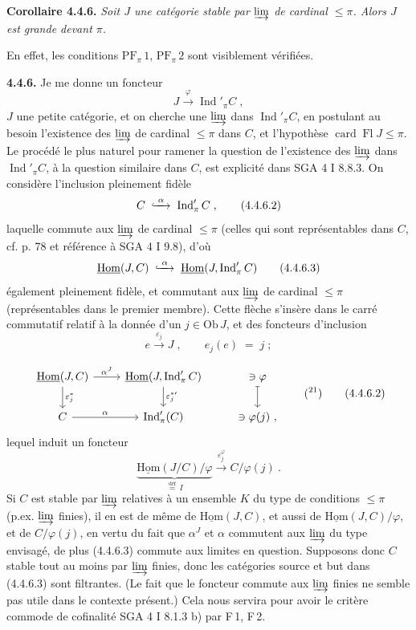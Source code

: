 \documentclass[11pt]{article}
\newcommand{\printedpage}[1]{\if\relax\detokenize{#1}\relax\else\marginpar{\footnotesize p.~#1}\fi}
\newcommand{\msp}[1]{\marginpar{\footnotesize [#1]}}
\newcommand{\uHom}{\underline{\mathrm{Hom}}}
\newcommand{\Ob}{\mathrm{Ob}\,}
\newcommand{\card}{\operatorname{card}}
\newcommand{\Fl}{\operatorname{Fl}}
\newcommand{\Ind}{\operatorname{Ind}}
\newcommand{\hookxrightarrow}[2][]{\lhook\joinrel\xrightarrow[#1]{#2}}
\begin{document}
\textbf{Corollaire 4.4.6.} \textit{Soit $J$ une catégorie stable par} $\varinjlim$ \textit{de cardinal $\leqslant \pi$. Alors $J$ est grande devant $\pi$.}

En effet, les conditions $\mathrm{PF}_{\pi}\,1$, $\mathrm{PF}_{\pi}\,2$ sont visiblement vérifiées.

\msp{page 83}
\textbf{4.4.6.} Je me donne un foncteur %
\[
J \xrightarrow{\;\varphi\;} \Ind'_\pi C \;, \tag*{(4.4.6.1)}
\]
$J$ une petite catégorie, et on cherche une $\varinjlim$ dans $\Ind'_\pi C$, en postulant au besoin l'existence des $\varinjlim$ de cardinal $\leqslant \pi$ dans $C$, et l'hypothèse $\card\Fl J \leqslant \pi$. Le procédé le plus naturel pour ramener la question de l'existence des $\varinjlim$ dans $\Ind'_\pi C$, à la question similaire dans $C$, est explicité dans SGA 4 I 8.8.3. On considère l'inclusion pleinement fidèle
\[
C \;\hookxrightarrow{\;\alpha\;}\; \Ind'_\pi C \;, \tag*{(4.4.6.2)}
\]
laquelle commute aux $\varinjlim$ de cardinal $\leqslant \pi$ (celles qui sont représentables dans $C$, cf. p. 78 et référence à SGA 4 I 9.8), d'où
\[
\uHom(J,C) \;\hookxrightarrow{\;\alpha\;}\; \uHom(J,\Ind'_\pi C) \tag*{(4.4.6.3)}
\]
également pleinement fidèle, et commutant aux $\varinjlim$ de cardinal $\leqslant \pi$ (représentables dans le premier membre). Cette flèche s'insère dans le carré commutatif relatif à la donnée d'un $j \in \Ob J$, et des foncteurs d'inclusion
\[
e \xrightarrow{\;\varepsilon_j\;} J \;, \qquad e_j(e) \;=\; j \;; \tag*{(4.4.6.4)} %
\]

\printedpage{19}

\msp{page 84}
\[
\begin{tikzcd}
\uHom(J,C) \arrow[r, "\alpha^J"] \arrow[d, "\varepsilon_j^*"] & \uHom(J,\Ind'_\pi C) \arrow[d, "{\varepsilon_j^{*\prime}}"] & \ni \varphi \arrow[d, mapsto] \\
C \arrow[r, "\alpha"] & \Ind'_\pi(C) & \ni \varphi(j)\ ,
\end{tikzcd}
\qquad (\text{\footnotemark[21]})
\tag*{(4.4.6.2)}
\]
lequel induit un foncteur
\[
\underbrace{\uHom(J/C)/\varphi}_{\overset{\text{déf}}{=}\, I} \xrightarrow{\varepsilon_j^\varphi} C/\varphi(j)\ . \tag*{(4.4.6.3)} %
\]
Si $C$ est stable par $\varinjlim$ relatives à un ensemble $K$ du type de conditions $\leqslant \pi$ (p.ex. $\varinjlim$ finies), il en est de même de $\uHom(J,C)$, et aussi de $\uHom(J,C)/\varphi$, et de $C/\varphi(j)$, en vertu du fait que $\alpha^J$ et $\alpha$ commutent aux $\varinjlim$ du type envisagé, de plus (4.4.6.3) commute aux limites en question. Supposons donc $C$ stable tout au moins par $\varinjlim$ finies, donc les catégories source et but dans (4.4.6.3) sont filtrantes. (Le fait que le foncteur commute aux $\varinjlim$ finies ne semble pas utile dans le contexte présent.) Cela nous servira pour avoir le critère commode de cofinalité SGA 4 I 8.1.3 b) par F\,1, F\,2.
\end{document}
